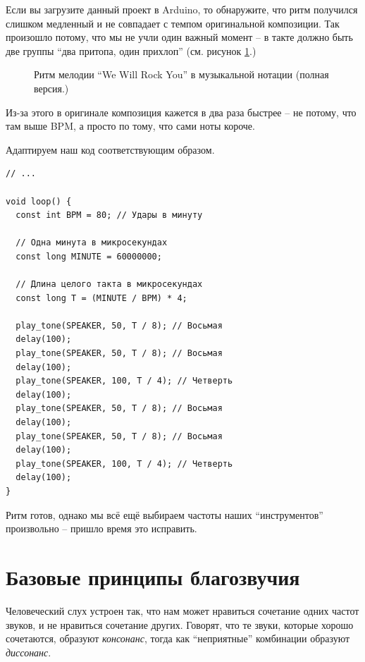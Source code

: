 \documentclass[a4paper,twoside]{book}
\begin{document}
Если вы загрузите данный проект в Arduino, то обнаружите, что ритм получился
слишком медленный и не совпадает с темпом оригинальной композиции. Так произошло
потому, что мы не учли один важный момент -- в такте должно быть две группы ``два
притопа, один прихлоп'' (см. рисунок \ref{fig:lilypond-queen-2}.)

\begin{figure}[ht]
  \caption{Ритм мелодии ``We Will Rock You'' в музыкальной нотации (полная версия.)}
  \centering
  \label{fig:lilypond-queen-2}
\end{figure}

Из-за этого в оригинале композиция кажется в два раза быстрее -- не потому, что
там выше BPM, а просто по тому, что сами ноты короче.

Адаптируем наш код соответствующим образом.

\begin{verbatim}
// ...

void loop() {
  const int BPM = 80; // Удары в минуту

  // Одна минута в микросекундах
  const long MINUTE = 60000000;

  // Длина целого такта в микросекундах
  const long T = (MINUTE / BPM) * 4;

  play_tone(SPEAKER, 50, T / 8); // Восьмая
  delay(100);
  play_tone(SPEAKER, 50, T / 8); // Восьмая
  delay(100);
  play_tone(SPEAKER, 100, T / 4); // Четверть
  delay(100);
  play_tone(SPEAKER, 50, T / 8); // Восьмая
  delay(100);
  play_tone(SPEAKER, 50, T / 8); // Восьмая
  delay(100);
  play_tone(SPEAKER, 100, T / 4); // Четверть
  delay(100);
}
\end{verbatim}

Ритм готов, однако мы всё ещё выбираем частоты наших ``инструментов''
произвольно -- пришло время это исправить.

\newpage
\section{Базовые принципы благозвучия}

Человеческий слух устроен так, что нам может нравиться сочетание одних частот
звуков, и не нравиться сочетание других. Говорят, что те звуки, которые хорошо
сочетаются, образуют \emph{консонанс}, тогда как ``неприятные'' комбинации
образуют \emph{диссонанс}.
\end{document}
